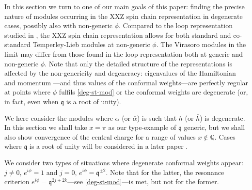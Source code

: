 \documentclass[a4paper,10pt]{article}
\newcommand{\q}{\mathfrak{q}}
\newcommand{\linnea}[1]{$\framebox{\tiny L}$\ \textbf{\texttt{{\color{red}\footnotesize#1}}}}
\newcommand{\aSt}{\mathcal{W}}
\newcommand{\AStTL}[2]{\aSt_{#1,#2}}
\newcommand{\Hlatt}{\mathcal{H}}
\newcommand{\Platt}{\mathcal{P}}
\begin{document}
In this section we turn to one of our main goals of this paper: finding the precise nature of modules occurring in the XXZ spin chain representation in degenerate cases, possibly also with non-generic $\phi$. %
Compared to the loop representation studied in \cite{LoopPaper}, the XXZ spin chain representation allows for both standard and co-standard Temperley-Lieb modules at non-generic $\phi$. The Virasoro modules in the limit may differ from those found in the loop representation both at generic and non-generic $\phi$. 
%
 Note that only the detailed structure of the representations is affected by the non-genericity and degeneracy: eigenvalues of the Hamiltonian and momentum %
---and thus values of the conformal weights---are  perfectly regular at points where  $\phi$ fulfils \eqref{deg-st-mod} or the conformal weights are degenerate (or, in fact, even when $\q$ is a root of unity). 


We here consider the modules where $\alpha$ (or $\bar{\alpha}$) is such that $h$ (or $\bar{h}$) is degenerate. In this section we shall take $x=\pi$ as our type-example of $\q$ generic, but we shall also show convergence of the central charge for a range of values $x\notin\mathbb{Q}$.
Cases where $\q$ is a root of unity will be considered in a later paper \cite{fullynongenericpaper}.

We consider two types of situations where degenerate conformal weights appear: $j\neq 0$, $e^{i\phi}=1$ and $j=0$, $e^{i\phi}=\q^{\pm2}$. Note that for the latter, the resonance criterion $e^{i\phi} = \q^{2j+2k}$---see \eqref{deg-st-mod}---is met, but not for the former. %
\end{document}
